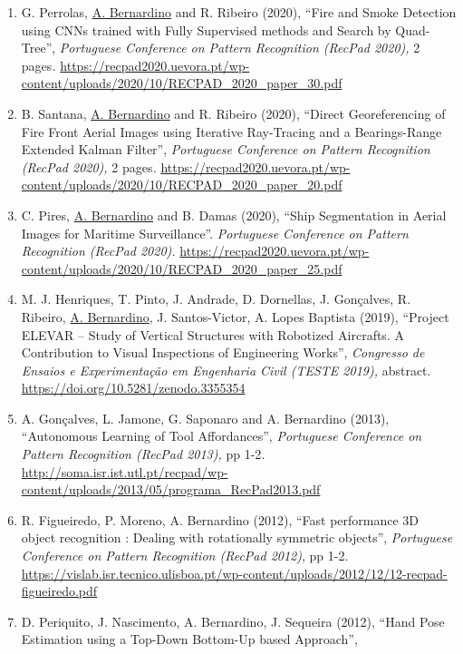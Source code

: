 \begin{enumerate}
{  Recognition (RecPad 2020),} 2 pages\emph{.}
  \url{https://recpad2020.uevora.pt/wp-content/uploads/2020/10/RECPAD_2020_paper_34.pdf}~
\item
  G. Perrolas, \ul{A. Bernardino} and R. Ribeiro (2020), ``Fire and
  Smoke Detection using CNN\textquotesingle s trained with Fully
  Supervised methods and Search by Quad-Tree'', \emph{Portuguese
  Conference on Pattern Recognition (RecPad 2020),} 2 pages\emph{.}
  \url{https://recpad2020.uevora.pt/wp-content/uploads/2020/10/RECPAD_2020_paper_30.pdf}~
\item
  B. Santana, \ul{A. Bernardino} and R. Ribeiro (2020), ``Direct
  Georeferencing of Fire Front Aerial Images using Iterative Ray-Tracing
  and a Bearings-Range Extended Kalman Filter'', \emph{Portuguese
  Conference on Pattern Recognition (RecPad 2020),} 2 pages\emph{.}
  \url{https://recpad2020.uevora.pt/wp-content/uploads/2020/10/RECPAD_2020_paper_20.pdf}~
\item
  C. Pires, \ul{A. Bernardino} and B. Damas (2020), ``Ship Segmentation
  in Aerial Images for Maritime Surveillance''. \emph{Portuguese
  Conference on Pattern Recognition (RecPad 2020).}
  \url{https://recpad2020.uevora.pt/wp-content/uploads/2020/10/RECPAD_2020_paper_25.pdf}
\item
  M. J. Henriques, T. Pinto, J. Andrade, D. Dornellas, J. Gonçalves, R.
  Ribeiro, \ul{A. Bernardino}, J. Santos-Victor, A. Lopes Baptista
  (2019), ``Project ELEVAR -- Study of Vertical Structures with
  Robotized Aircrafts. A Contribution to Visual Inspections of
  Engineering Works'', \emph{Congresso de Ensaios e Experimentação em
  Engenharia Civil (TESTE 2019),} abstract.
  \url{https://doi.org/10.5281/zenodo.3355354}~
\item
  A. Gonçalves, L. Jamone, G. Saponaro and A. Bernardino (2013),
  ``Autonomous Learning of Tool Affordances'', \emph{Portuguese
  Conference on Pattern Recognition (RecPad 2013),} pp 1-2\emph{.}
  \url{http://soma.isr.ist.utl.pt/recpad/wp-content/uploads/2013/05/programa_RecPad2013.pdf}
\item
  R. Figueiredo, P. Moreno, A. Bernardino (2012), ``Fast performance 3D
  object recognition : Dealing with rotationally symmetric objects'',
  \emph{Portuguese Conference on Pattern Recognition (RecPad 2012)}, pp
  1-2.
  \url{https://vislab.isr.tecnico.ulisboa.pt/wp-content/uploads/2012/12/12-recpad-figueiredo.pdf}
\item
  D. Periquito, J. Nascimento, A. Bernardino, J. Sequeira (2012), ``Hand
  Pose Estimation using a Top-Down Bottom-Up based Approach'',

\end{enumerate}
